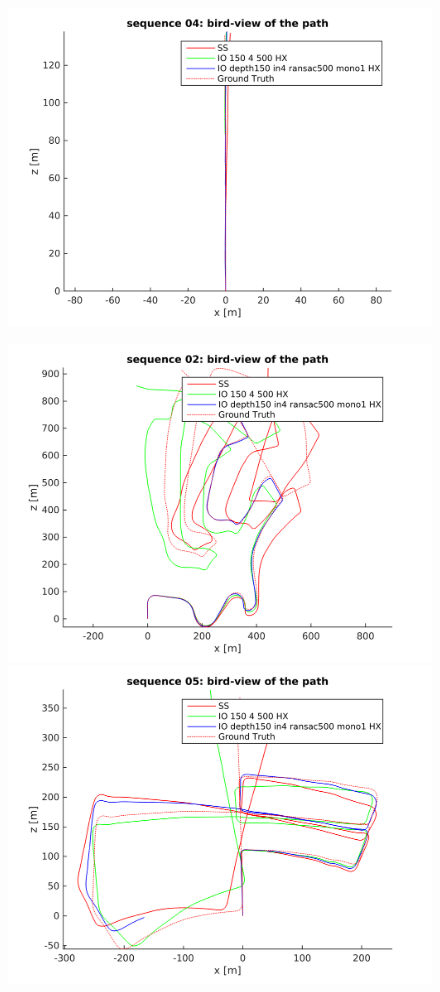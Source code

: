 \documentclass[runningheads]{llncs}
\begin{document}
\begin{figure}
\begin{minipage}[t]{.3\linewidth}
    \includegraphics[width=\textwidth]{top_path_04}
  \end{minipage}
  \begin{minipage}[t]{.3\linewidth}
    \centering
    \includegraphics[width=\textwidth]{top_path_02}
    \includegraphics[width=\textwidth]{top_path_05}

\end{minipage}
\end{figure}
\end{document}
